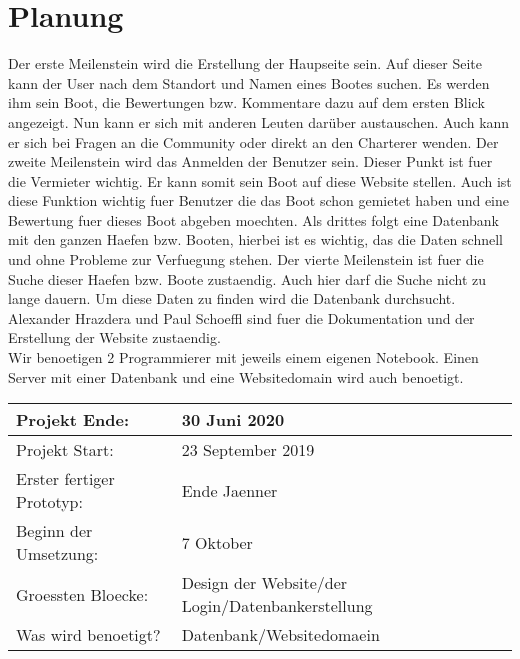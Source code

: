 \documentclass[12pt]{article}
\theoremstyle{definition}
\begin{document}
\pagebreak

\section{Planung}
Der erste Meilenstein wird die Erstellung der Haupseite sein. Auf dieser Seite kann der User nach dem Standort und Namen eines Bootes suchen. Es werden ihm sein Boot, die Bewertungen bzw. Kommentare dazu auf dem ersten Blick angezeigt. Nun kann er sich mit anderen Leuten darüber austauschen. Auch kann er sich bei Fragen an die Community oder direkt an den Charterer wenden. 
Der zweite Meilenstein wird das Anmelden der Benutzer sein. Dieser Punkt ist fuer die Vermieter wichtig. Er kann somit sein Boot auf diese Website stellen. Auch ist diese Funktion wichtig fuer Benutzer die das Boot schon gemietet haben und eine Bewertung fuer dieses Boot abgeben moechten.
Als drittes folgt eine Datenbank mit den ganzen Haefen bzw. Booten, hierbei ist es wichtig, das die Daten schnell und ohne Probleme zur Verfuegung stehen. Der vierte Meilenstein ist fuer die Suche dieser Haefen bzw. Boote zustaendig. Auch hier darf die Suche nicht zu lange dauern. Um diese Daten zu finden wird die Datenbank durchsucht.\\ Alexander Hrazdera und Paul Schoeffl sind fuer die Dokumentation und der Erstellung der Website zustaendig.\\ Wir benoetigen 2 Programmierer mit jeweils einem eigenen Notebook. Einen Server mit einer Datenbank und eine Websitedomain wird auch benoetigt.

\newcommand{\projektend}{30 Juni 2020}
\newcommand{\projectstart}{23 September 2019}
\newcommand{\firstresult}{Ende Jaenner}
\newcommand{\beginofprog}{7 Oktober}
\newcommand{\bigBlocks}{Design der Website/der Login/Datenbankerstellung}
\newcommand{\whatisneeded}{Datenbank/Websitedomaein}

\begin{flushleft} 
\begin{tabular}{|l|l|}
\hline
Projekt Ende: & \projektend \\ \hline
Projekt Start: & \projectstart \\ \hline
Erster fertiger Prototyp: & \firstresult \\ \hline
Beginn der Umsetzung: & \beginofprog \\ \hline
Groessten Bloecke: & \bigBlocks \\ \hline
Was wird benoetigt? & \whatisneeded \\ \hline
\end{tabular}
\end{flushleft}
\cite{wikipedia_2016}
{}

\end{document}

